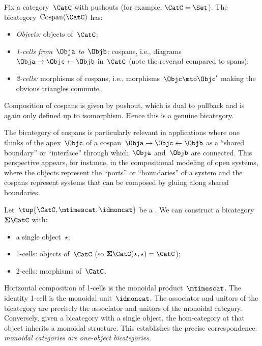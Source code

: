 \begin{example}
    \label{exa:bicat-cospan}
    Fix a category~$\CatC$ with pushouts (for example, $\CatC = \Set$).
    The bicategory~$\operatorname{Cospan}(\CatC)$ has:
    \begin{itemize}
        \item \emph{Objects:} objects of~$\CatC$;
        \item \emph{1-cells from~$\Obja$ to~$\Objb$:} cospans, i.e., diagrams~$\Obja \rightarrow \Objc \leftarrow \Objb$ in~$\CatC$ (note the reversal compared to spans);
        \item \emph{2-cells:} morphisms of cospans, i.e., morphisms~$\Objc \mto \Objc'$ making the obvious triangles commute.
    \end{itemize}
    Composition of cospans is given by pushout, which is dual to pullback and is again only defined up to isomorphism.
    Hence this is a genuine bicategory.

    The bicategory of cospans is particularly relevant in applications where one thinks of the apex~$\Objc$ of a cospan~$\Obja \rightarrow \Objc \leftarrow \Objb$ as a ``shared boundary'' or ``interface'' through which~$\Obja$ and~$\Objb$ are connected.
    This perspective appears, for instance, in the compositional modeling of open systems, where the objects represent the ``ports'' or ``boundaries'' of a system and the cospans represent systems that can be composed by gluing along shared boundaries.
\end{example}

\begin{example}
    \label{exa:bicat-monoidal}
    Let~$\tup{\CatC, \mtimescat, \idmoncat}$ be a .
    We can construct a bicategory~$\mathbf{\Sigma}\CatC$ with:
    \begin{itemize}
        \item a single object~$\star$;
        \item 1-cells: objects of~$\CatC$ (so $\mathbf{\Sigma}\CatC(\star, \star) = \CatC$);
        \item 2-cells: morphisms of~$\CatC$.
    \end{itemize}
    Horizontal composition of 1-cells is the monoidal product~$\mtimescat$.
    The identity 1-cell is the monoidal unit~$\idmoncat$.
    The associator and unitors of the bicategory are precisely the associator and unitors of the monoidal category.
    Conversely, given a bicategory with a single object, the hom-category at that object inherits a monoidal structure.
    This establishes the precise correspondence: \emph{monoidal categories are one-object bicategories}.
\end{example}

